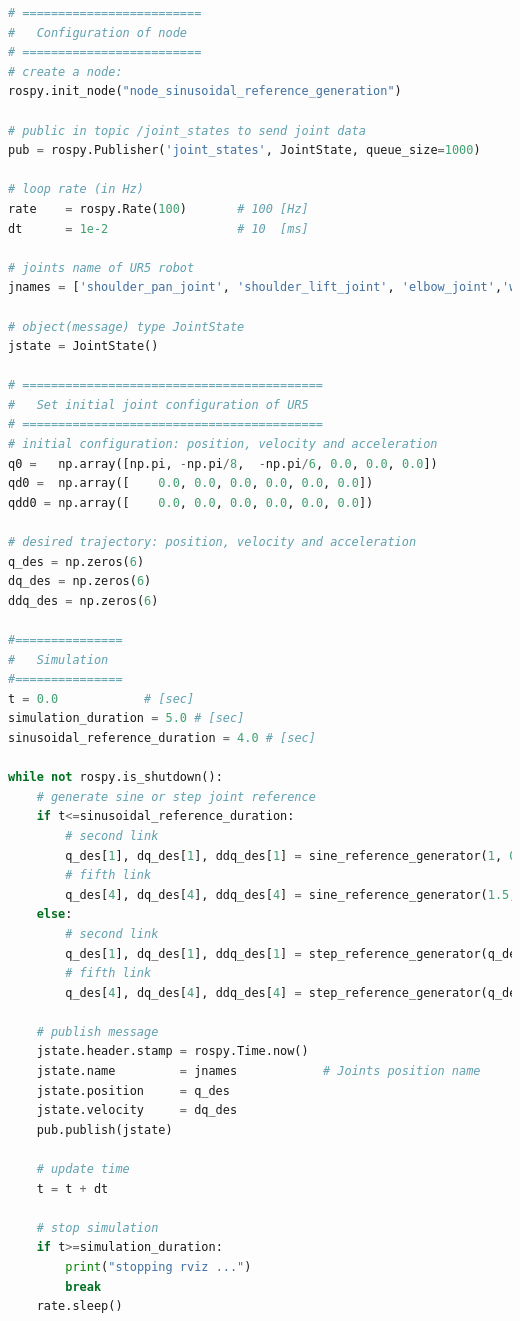 \begin{lstlisting}[language=Python,caption=Move the second and fifth joint of UR5 robot.,label={ lst:rosnode_sine_reference_generator}]
# =========================
#   Configuration of node
# =========================
# create a node: 
rospy.init_node("node_sinusoidal_reference_generation")

# public in topic /joint_states	to send joint data	
pub = rospy.Publisher('joint_states', JointState, queue_size=1000)

# loop rate (in Hz)
rate 	= rospy.Rate(100)		# 100 [Hz]
dt 		= 1e-2					# 10  [ms]

# joints name of UR5 robot
jnames = ['shoulder_pan_joint', 'shoulder_lift_joint', 'elbow_joint','wrist_1_joint', 'wrist_2_joint', 'wrist_3_joint']

# object(message) type JointState
jstate = JointState()

# ==========================================
#   Set initial joint configuration of UR5
# ==========================================
# initial configuration: position, velocity and acceleration 
q0 =   np.array([np.pi, -np.pi/8,  -np.pi/6, 0.0, 0.0, 0.0])
qd0 =  np.array([    0.0, 0.0, 0.0, 0.0, 0.0, 0.0])
qdd0 = np.array([    0.0, 0.0, 0.0, 0.0, 0.0, 0.0]) 

# desired trajectory: position, velocity and acceleration
q_des = np.zeros(6)
dq_des = np.zeros(6)
ddq_des = np.zeros(6)

#===============
#   Simulation
#===============
t = 0.0            # [sec] 
simulation_duration = 5.0 # [sec]
sinusoidal_reference_duration = 4.0 # [sec]

while not rospy.is_shutdown():
    # generate sine or step joint reference
    if t<=sinusoidal_reference_duration:
        # second link
        q_des[1], dq_des[1], ddq_des[1] = sine_reference_generator(1, 0.2, t)
        # fifth link
        q_des[4], dq_des[4], ddq_des[4] = sine_reference_generator(1.5, 0.4, t)
    else:
        # second link
        q_des[1], dq_des[1], ddq_des[1] = step_reference_generator(q_des[1])
        # fifth link
        q_des[4], dq_des[4], ddq_des[4] = step_reference_generator(q_des[4])

    # publish message
    jstate.header.stamp = rospy.Time.now()
    jstate.name 		= jnames			# Joints position name
    jstate.position 	= q_des
    jstate.velocity 	= dq_des
    pub.publish(jstate)

    # update time
    t = t + dt
    
    # stop simulation
    if t>=simulation_duration:
        print("stopping rviz ...")
        break
    rate.sleep()
\end{lstlisting}


